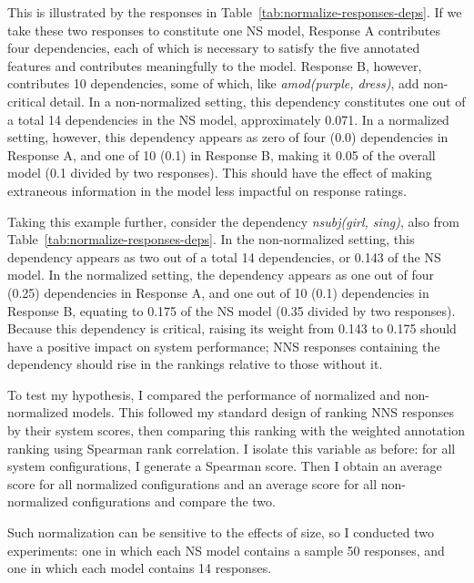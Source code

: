 This is illustrated by the responses in Table~\ref{tab:normalize-responses-deps}. If we take these two responses to constitute one NS model, Response A contributes four dependencies, each of which is necessary to satisfy the five annotated features and contributes meaningfully to the model. Response B, however, contributes 10 dependencies, some of which, like \textit{amod(purple, dress)}, add non-critical detail. In a non-normalized setting, this dependency constitutes one out of a total 14 dependencies in the NS model, approximately 0.071. In a normalized setting, however, this dependency appears as zero of four (0.0) dependencies in Response A, and one of 10 (0.1) in Response B, making it 0.05 of the overall model (0.1 divided by two responses). This should have the effect of making extraneous information in the model less impactful on response ratings.

Taking this example further, consider the dependency \textit{nsubj(girl, sing)}, also from Table~\ref{tab:normalize-responses-deps}. In the non-normalized setting, this dependency appears as two out of a total 14 dependencies, or 0.143 of the NS model. In the normalized setting, the dependency appears as one out of four (0.25) dependencies in Response A, and one out of 10 (0.1) dependencies in Response B, equating to 0.175 of the NS model (0.35 divided by two responses). Because this dependency is critical, raising its weight from 0.143 to 0.175 should have a positive impact on system performance; NNS responses containing the dependency should rise in the rankings relative to those without it. 

To test my hypothesis, I compared the performance of normalized and non-normalized models. This followed my standard design of ranking NNS responses by their system scores, then comparing this ranking with the weighted annotation ranking using Spearman rank correlation. I isolate this variable as before: for all system configurations, I generate a Spearman score. Then I obtain an average score for all normalized configurations and an average score for all non-normalized configurations and compare the two.

Such normalization can be sensitive to the effects of size, so I conducted two experiments: one in which each NS model contains a sample 50 responses, and one in which each model contains 14 responses.


